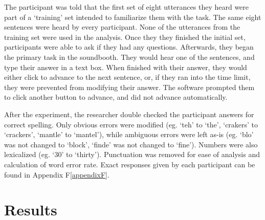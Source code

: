 The participant was told that the first set of eight utterances they heard were part of a `training' set intended to familiarize them with the task. The same eight sentences were heard by every participant.  None of the utterances from the training set were used in the analysis.  Once they they finished the initial set, participants were able to ask if they had any questions.  Afterwards, they began the primary task in the soundbooth.  They would hear one of the sentences, and type their answer in a text box.  When finished with their answer, they would either click to advance to the next sentence, or, if they ran into the time limit, they were prevented from modifying their answer.  The software prompted them to click another button to advance, and did not advance automatically.

After the experiment, the researcher double checked the participant answers for correct spelling.  Only obvious errors were modified (eg. `teh' to `the', `crakers' to `crackers', `mantle' to `mantel'), while ambiguous errors were left as-is (eg. `blo' was not changed to `block', `finde' was not changed to `fine').  Numbers were also lexicalized (eg. `30' to `thirty').  Punctuation was removed for ease of analysis and calculation of word error rate.  Exact responses given by each participant can be found in Appendix F\ref{appendixF}.


\section{Results}
\label{chap3:results}


